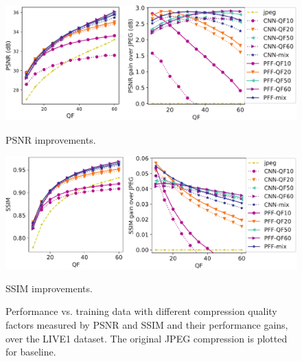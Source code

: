\documentclass[10pt,twocolumn,letterpaper]{article}
\begin{document}
\begin{figure}[t]
    \centering
    \begin{minipage}{0.5\textwidth}
        \centering
        \includegraphics[width=1\linewidth]{PSNR_comparison_v3}
        \vspace{-8mm}
        \caption*{PSNR improvements.}
    \end{minipage}%
    \vspace{3mm}
    \begin{minipage}{.5\textwidth}
        \centering
        \includegraphics[width=1\linewidth]{SSIM_comparison_v3}
        \vspace{-8mm}
        \caption*{SSIM improvements.}
    \end{minipage}
    \vspace{-4mm}
    \caption{Performance vs. training data with different compression quality
    factors measured by PSNR and SSIM and their performance gains, over the
    LIVE1 dataset.  The original JPEG compression is plotted for baseline.}
    \label{fig:curves_jpeg}
\end{figure}
\end{document}
